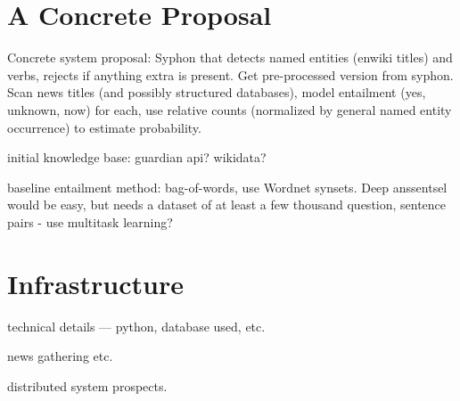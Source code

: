 \documentclass[11pt,a4paper]{article}
\begin{document}
\section{A Concrete Proposal}
\label{system}

Concrete system proposal: Syphon that detects named entities (enwiki titles) and verbs, rejects if anything extra is present.
Get pre-processed version from syphon.
Scan news titles (and possibly structured databases), model entailment (yes, unknown, now) for each,
use relative counts (normalized by general named entity occurrence) to estimate probability.

initial knowledge base: guardian api? wikidata?

baseline entailment method: bag-of-words, use Wordnet synsets.
Deep anssentsel would be easy, but needs a dataset of at least a few thousand question, sentence pairs - use multitask learning?

\section{Infrastructure}
\label{infra}

technical details --- python, database used, etc.

news gathering etc.

distributed system prospects.



\end{document}
